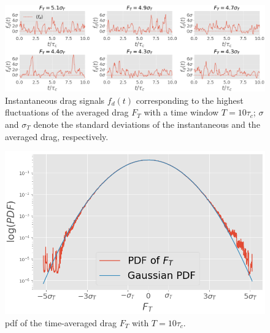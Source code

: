 \documentclass{jfm}
\newcommand{\QQ}[1]{{\color{green}{#1}}}
\begin{document}
\begin{figure}
	\centering
	\includegraphics[width=\linewidth]{timeseries_extrms_AVG/timeseries_extrms_AVG}
	\caption{Instantaneous drag signals $f_d(t)$ corresponding to the highest fluctuations of the averaged  drag $F_T$ with a time window $T = 10 \tau_c$;  $\sigma$ and $\sigma_T$ denote the standard deviations of the instantaneous and the averaged drag, respectively.}
	\label{fig:extreme_avg}
\end{figure}

\begin{figure}
	\centering
	\includegraphics[width=.7\linewidth]{PDF_AVG/PDF_AVG}
	\caption{\ac{pdf} of the time-averaged drag $F_T$ with $T = 10\tau_c$. 
	}
	\label{fig:PDF_AVG}
\end{figure}

%
\end{document}
